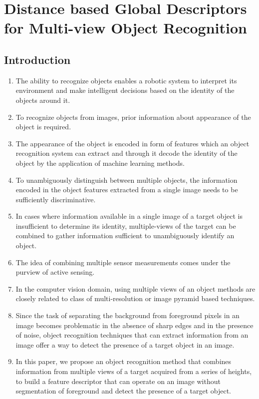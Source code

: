 \documentclass {udthesis}
\begin{document}

\chapter{Distance based Global Descriptors for Multi-view Object Recognition}
\label{chap:dist_des}

\section{Introduction}
\begin{enumerate}
	\item The ability to recognize objects enables a robotic system to interpret its environment and make intelligent decisions based on the identity of the objects around it.
	
	\item To recognize objects from images, prior information about appearance of the object is required.
	
	\item The appearance of the object is encoded in form of features which an object recognition system can extract and through it decode the identity of the object by the application of machine learning methods.

	\item To unambiguously distinguish between multiple objects, the information encoded in the object features extracted from a single image needs to be sufficiently discriminative.
	
	\item In cases where information available in a single image of a target object is insufficient to determine its identity, multiple-views of the target can be combined to gather information sufficient to unambiguously identify an object.
	
	\item The idea of combining multiple sensor measurements comes under the purview of active sensing.

	\item In the computer vision domain, using multiple views of an object methods are closely related to class of multi-resolution or image pyramid based techniques.

	\item Since the task of separating the background from foreground pixels in an image becomes problematic in the absence of sharp edges and in the presence of noise, object recognition techniques that can extract information from an image offer a way to detect the presence of a target object in an image.
		
	\item In this paper, we propose an object recognition method that combines information from multiple views of a target acquired from a series of heights, to build a feature descriptor that can operate on an image without segmentation of foreground and detect the presence of a target object.	
\end{enumerate}
\end{document}

